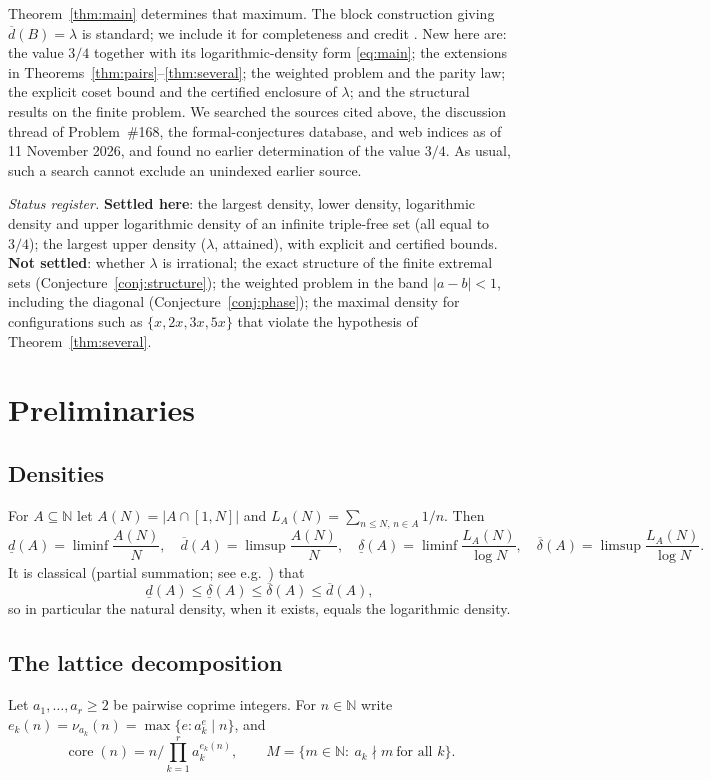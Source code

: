 \documentclass[11pt]{amsart}
\theoremstyle{definition}
\newcommand{\N}{\mathbb{N}}
\newcommand{\dlow}{\underline{d}}
\newcommand{\dup}{\overline{d}}
\newcommand{\llow}{\underline{\delta}}
\newcommand{\lup}{\overline{\delta}}
\begin{document}
Theorem~\ref{thm:main} determines that maximum. The block construction giving $\dup(B)=\lambda$ is standard; we include it for completeness and credit \cite{Coleski,GSW77,Chapman}. New here are: the value $3/4$ together with its logarithmic-density form \eqref{eq:main}; the extensions in Theorems~\ref{thm:pairs}--\ref{thm:several}; the weighted problem and the parity law; the explicit coset bound and the certified enclosure of $\lambda$; and the structural results on the finite problem. We searched the sources cited above, the discussion thread of Problem~\#168, the formal-conjectures database, and web indices as of 11 November 2026, and found no earlier determination of the value $3/4$. As usual, such a search cannot exclude an unindexed earlier source.

\emph{Status register.} \textbf{Settled here}: the largest density, lower density, logarithmic density and upper logarithmic density of an infinite triple-free set (all equal to $3/4$); the largest upper density ($\lambda$, attained), with explicit and certified bounds. \textbf{Not settled}: whether $\lambda$ is irrational; the exact structure of the finite extremal sets (Conjecture~\ref{conj:structure}); the weighted problem in the band $|a-b|<1$, including the diagonal (Conjecture~\ref{conj:phase}); the maximal density for configurations such as $\{x,2x,3x,5x\}$ that violate the hypothesis of Theorem~\ref{thm:several}.

\section{Preliminaries}\label{sec:prelim}

\subsection{Densities}
For $A\subseteq\N$ let $A(N)=|A\cap[1,N]|$ and $L_A(N)=\sum_{n\le N,\,n\in A}1/n$. Then
\[
\dlow(A)=\liminf\frac{A(N)}{N},\quad \dup(A)=\limsup\frac{A(N)}{N},\quad \llow(A)=\liminf\frac{L_A(N)}{\log N},\quad \lup(A)=\limsup\frac{L_A(N)}{\log N}.
\]
It is classical (partial summation; see e.g.\ \cite[Ch.~III.1]{Tenenbaum}) that
\begin{equation}\label{eq:densities}
\dlow(A)\le\llow(A)\le\lup(A)\le\dup(A),
\end{equation}
so in particular the natural density, when it exists, equals the logarithmic density.

\subsection{The lattice decomposition}
Let $a_1,\dots,a_r\ge2$ be pairwise coprime integers. For $n\in\N$ write $e_k(n)=\nu_{a_k}(n)=\max\{e:a_k^e\mid n\}$, and
\[
\operatorname{core}(n)=n\Big/\prod_{k=1}^r a_k^{e_k(n)},\qquad M=\{m\in\N:\ a_k\nmid m\ \text{for all }k\}.
\]
\end{document}
